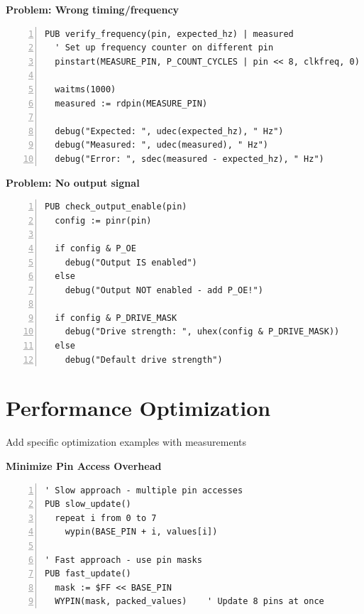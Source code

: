 \documentclass[11pt,a4paper,oneside,english]{book}
\begin{document}
\textbf{Problem: Wrong timing/frequency}

\begin{Spin2Block}
\begin{Verbatim}[numbers=left,numbersep=5pt,xleftmargin=15pt]
PUB verify_frequency(pin, expected_hz) | measured
  ' Set up frequency counter on different pin
  pinstart(MEASURE_PIN, P_COUNT_CYCLES | pin << 8, clkfreq, 0)
  
  waitms(1000)
  measured := rdpin(MEASURE_PIN)
  
  debug("Expected: ", udec(expected_hz), " Hz")
  debug("Measured: ", udec(measured), " Hz")
  debug("Error: ", sdec(measured - expected_hz), " Hz")
\end{Verbatim}
\end{Spin2Block}

\textbf{Problem: No output signal}

\begin{Spin2Block}
\begin{Verbatim}[numbers=left,numbersep=5pt,xleftmargin=15pt]
PUB check_output_enable(pin)
  config := pinr(pin)
  
  if config & P_OE
    debug("Output IS enabled")
  else
    debug("Output NOT enabled - add P_OE!")
    
  if config & P_DRIVE_MASK
    debug("Drive strength: ", uhex(config & P_DRIVE_MASK))
  else
    debug("Default drive strength")
\end{Verbatim}
\end{Spin2Block}

\hypertarget{performance-optimization}{%
\section{Performance Optimization}\label{performance-optimization}}

Add specific optimization examples with measurements

\textbf{Minimize Pin Access Overhead}

\begin{Spin2Block}
\begin{Verbatim}[numbers=left,numbersep=5pt,xleftmargin=15pt]
' Slow approach - multiple pin accesses
PUB slow_update()
  repeat i from 0 to 7
    wypin(BASE_PIN + i, values[i])
    
' Fast approach - use pin masks
PUB fast_update()
  mask := $FF << BASE_PIN
  WYPIN(mask, packed_values)    ' Update 8 pins at once
\end{Verbatim}
\end{Spin2Block}
\end{document}
